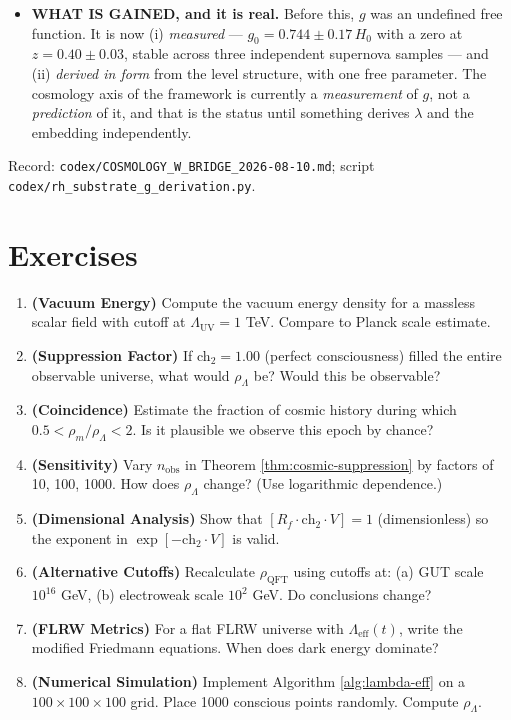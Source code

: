 \begin{itemize}
\begin{itemize}
no freedom at all, gives $w_0 = -0.455$: excluded at $5.2\sigma$.
\end{itemize}
\item \textbf{WHAT IS GAINED, and it is real.} Before this, $g$ was an
undefined free function. It is now (i) \emph{measured} --- $g_0 = 0.744 \pm 0.17\,
H_0$ with a zero at $z = 0.40 \pm 0.03$, stable across three independent
supernova samples --- and (ii) \emph{derived in form} from the level structure,
with one free parameter. The cosmology axis of the framework is currently a
\emph{measurement} of $g$, not a \emph{prediction} of it, and that is the
status until something derives $\lambda$ and the embedding independently.
\end{itemize}

\noindent Record: \texttt{codex/COSMOLOGY\_W\_BRIDGE\_2026-08-10.md};
script \texttt{codex/rh\_substrate\_g\_derivation.py}.

\section*{Exercises}

\begin{enumerate}
\item \textbf{(Vacuum Energy)} Compute the vacuum energy density for a massless scalar field with cutoff at $\Lambda_{\text{UV}} = 1$ TeV. Compare to Planck scale estimate.

\item \textbf{(Suppression Factor)} If ch$_2 = 1.00$ (perfect consciousness) filled the entire observable universe, what would $\rho_\Lambda$ be? Would this be observable?

\item \textbf{(Coincidence)} Estimate the fraction of cosmic history during which $0.5 < \rho_m / \rho_\Lambda < 2$. Is it plausible we observe this epoch by chance?

\item \textbf{(Sensitivity)} Vary $n_{\text{obs}}$ in Theorem \ref{thm:cosmic-suppression} by factors of 10, 100, 1000. How does $\rho_\Lambda$ change? (Use logarithmic dependence.)

\item \textbf{(Dimensional Analysis)} Show that $[R_f \cdot \text{ch}_2 \cdot V] = 1$ (dimensionless) so the exponent in $\exp[-\text{ch}_2 \cdot V]$ is valid.

\item \textbf{(Alternative Cutoffs)} Recalculate $\rho_{\text{QFT}}$ using cutoffs at: (a) GUT scale $10^{16}$ GeV, (b) electroweak scale $10^2$ GeV. Do conclusions change?

\item \textbf{(FLRW Metrics)} For a flat FLRW universe with $\Lambda_{\text{eff}}(t)$, write the modified Friedmann equations. When does dark energy dominate?

\item \textbf{(Numerical Simulation)} Implement Algorithm \ref{alg:lambda-eff} on a $100 \times 100 \times 100$ grid. Place 1000 conscious points randomly. Compute $\rho_\Lambda$.
\end{enumerate}

